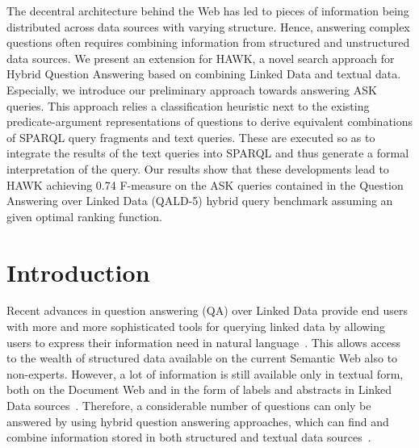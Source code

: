 The decentral architecture behind the Web has led to pieces of information being distributed across data sources with varying structure. Hence, answering complex questions often requires combining information from structured and unstructured data sources.   
We present an extension for HAWK, a novel search approach for Hybrid Question Answering based on combining Linked Data and textual data.
Especially, we introduce our preliminary approach towards answering ASK queries. This approach relies a classification heuristic next to the existing predicate-argument representations of questions to derive equivalent combinations of SPARQL query fragments and text queries. These are executed so as to integrate the results of the text queries into SPARQL and thus generate a formal interpretation of the query.
%
Our results show that these developments lead to HAWK achieving 0.74 F-measure on the ASK queries contained in the Question Answering over Linked Data (QALD-5) hybrid query benchmark assuming an given optimal ranking function. %


\section{Introduction}
Recent advances in question answering (QA) over Linked Data provide end users with more and more sophisticated tools for querying linked data by allowing users to express their information need in natural language~\cite{SINA_WebSemantic,tbsl,pythia}. 
This allows access to the wealth of structured data available on the current Semantic Web also to non-experts. However, a lot of information is still available only in textual form, both on the Document Web and in the form of labels and abstracts in Linked Data sources~\cite{rdflivenews}.
Therefore, a considerable number of questions can only be answered by using hybrid question answering approaches, which  can find and combine information stored in both structured and textual data sources~\cite{combiningLDandIR}.

